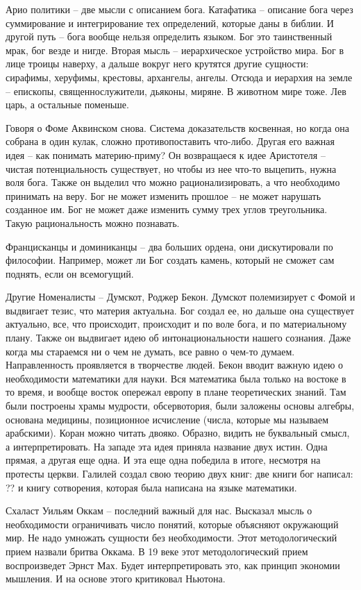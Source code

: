 \documentclass[a4paper, 12pt]{article}
\begin{document}
Арио политики -- две мысли с описанием бога. Катафатика -- описание бога через суммирование и интегрирование тех определений, которые даны в библии. И другой путь -- бога вообще нельзя определить языком. Бог это таинственный мрак, бог везде и нигде. Вторая мысль -- иерархическое устройство мира. Бог в лице троицы наверху, а дальше вокруг него крутятся другие сущности: сирафимы, херуфимы, крестовы, архангелы, ангелы. Отсюда и иерархия на земле -- епископы, священнослужители, дьяконы, миряне. В животном мире тоже. Лев царь, а остальные поменьше.

Говоря о Фоме Аквинском снова. Система доказательств косвенная, но когда она собрана в один кулак, сложно противопоставить что-либо. Другая его важная идея -- как понимать материю-приму? Он возвращаеся к идее Аристотеля -- чистая потенциальность существует, но чтобы из нее что-то выцепить, нужна воля бога. Также он выделил что можно рационализировать, а что необходимо принимать на веру. Бог не может изменить прошлое -- не может нарушать созданное им. Бог не может даже изменить сумму трех углов треугольника. Такую рациональность можно познавать. 

Францисканцы и доминиканцы -- два больших ордена, они дискутировали по философии. Например, может ли Бог создать камень, который не сможет сам поднять, если он всемогущий. 

Другие Номеналисты -- Думскот, Роджер Бекон. Думскот полемизирует с Фомой и выдвигает тезис, что материя актуальна. Бог создал ее, но дальше она существует актуально, все, что происходит, происходит и по воле бога, и по материальному плану. Также он выдвигает идею об интонациональности нашего сознания. Даже когда мы стараемся ни о чем не думать, все равно о чем-то думаем. Направленность проявляется в творчестве людей. Бекон вводит важную идею о необходимости математики для науки. Вся математика была только на востоке в то время, и вообще восток опережал европу в плане теоретических знаний. Там были построены храмы мудрости, обсервотория, были заложены основы алгебры, основана медицины, позиционное исчисление (числа, которые мы называем арабскими). Коран можно читать двояко. Образно, видить не буквальный смысл, а интерпретировать. На западе эта идея приняла название двух истин. Одна прямая, а другая еще одна. И эта еще одна победила в итоге, несмотря на протесты церкви. Галилей создал свою теорию двух книг: две книги бог написал: ?? и книгу сотворения, которая была написана на языке математики. 

Схаласт Уильям Оккам -- последний важный для нас. Высказал мысль о необходимости ограничивать число понятий, которые объясняют окружающий мир. Не надо умножать сущности без необходимости. Этот методологический прием назвали бритва Оккама. В 19 веке этот методологический прием воспроизведет Эрнст Мах. Будет интерпретировать это, как принцип экономии мышления. И на основе этого критиковал Ньютона. 
\end{document}
